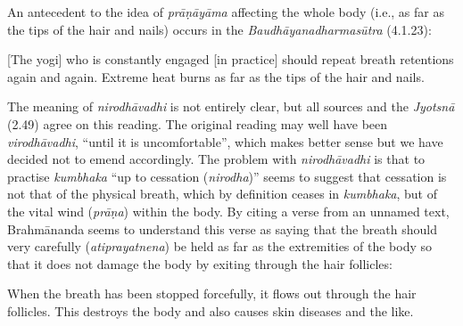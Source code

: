 \begin{ekdosis}
\begin{philcomm}[hp02_049]

An antecedent to the idea of \emph{prāṇāyāma} affecting the whole body (i.e., as far as the tips of the hair and nails) occurs in the \emph{Baudhāyanadharmasūtra} (4.1.23):

\begin{versinnote}
{[}The yogi] who is constantly engaged [in practice] should repeat breath retentions again and again. Extreme heat burns as far as the tips of the hair and nails. 
\end{versinnote}

\begin{versinnote}
\end{versinnote}

The meaning of \emph{nirodhāvadhi} is not entirely clear, but all sources and the \emph{Jyotsnā} (2.49) agree on this reading. The original reading may well have been \emph{virodhāvadhi}, “until it is uncomfortable”, which makes better sense but we have decided not to emend accordingly. The problem with \emph{nirodhāvadhi} is that to practise \emph{kumbhaka} ``up to cessation (\emph{nirodha})'' seems to suggest that cessation is not that of the physical breath, which by definition ceases in \emph{kumbhaka}, but of the vital wind (\emph{prāṇa}) within the body. By citing a verse from an unnamed text, Brahmānanda seems to understand this verse as saying that the breath should very carefully (\emph{atiprayatnena}) be held as far as the extremities of the body so that it does not damage the body by exiting through the hair follicles:


\begin{versinnote}
When the breath has been stopped forcefully, it flows out through the hair follicles. This destroys the body and also causes skin diseases and the like.
\end{versinnote}

\begin{versinnote}
%
\end{versinnote}
\end{philcomm}


\end{ekdosis}
